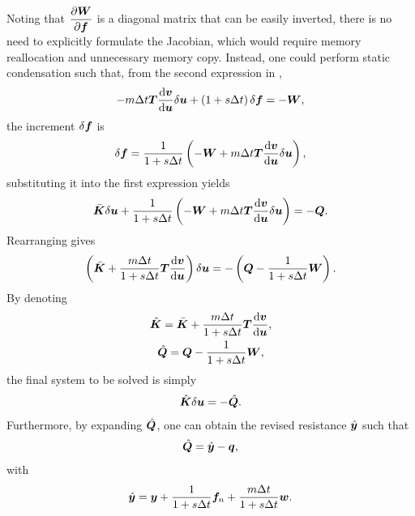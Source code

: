 Noting that $\dfrac{\partial{\bm{W}}}{\partial{\bm{f}}}$ is a diagonal matrix that can be easily inverted, there is no need to explicitly formulate the Jacobian, which would require memory reallocation and unnecessary memory copy. Instead, one could perform static condensation such that, from the second expression in ,
\begin{gather}
-m\Delta{}t\bm{T}\dfrac{\mathrm{d}\bm{v}}{\mathrm{d}\bm{u}}\delta\bm{u}+\left(1+s\Delta{}t\right)\delta\bm{f}=-\bm{W},
\end{gather}
the increment $\delta\bm{f}$ is
\begin{gather}\label{eq:incre_f}
\delta\bm{f}=\dfrac{1}{1+s\Delta{}t}\left(-\bm{W}+m\Delta{}t\bm{T}\dfrac{\mathrm{d}\bm{v}}{\mathrm{d}\bm{u}}\delta\bm{u}\right),
\end{gather}
substituting it into the first expression yields
\begin{gather}
\bar{\bm{K}}\delta\bm{u}+\dfrac{1}{1+s\Delta{}t}\left(-\bm{W}+m\Delta{}t\bm{T}\dfrac{\mathrm{d}\bm{v}}{\mathrm{d}\bm{u}}\delta\bm{u}\right)=-\bm{Q}.
\end{gather}
Rearranging gives
\begin{gather}
\left(\bar{\bm{K}}+\dfrac{m\Delta{}t}{1+s\Delta{}t}\bm{T}\dfrac{\mathrm{d}\bm{v}}{\mathrm{d}\bm{u}}\right)\delta\bm{u}=-\left(\bm{Q}-\dfrac{1}{1+s\Delta{}t}\bm{W}\right).
\end{gather}
By denoting
\begin{gather}\label{eq:revised_k}
\hat{\bm{K}}=\bar{\bm{K}}+\dfrac{m\Delta{}t}{1+s\Delta{}t}\bm{T}\dfrac{\mathrm{d}\bm{v}}{\mathrm{d}\bm{u}},\\
\hat{\bm{Q}}=\bm{Q}-\dfrac{1}{1+s\Delta{}t}\bm{W},
\end{gather}
the final system to be solved is simply
\begin{gather}\label{eq:revised_system}
\hat{\bm{K}}\delta\bm{u}=-\hat{\bm{Q}}.
\end{gather}
Furthermore, by expanding $\hat{\bm{Q}}$, one can obtain the revised resistance $\hat{\bm{y}}$ such that
\begin{gather}
\hat{\bm{Q}}=\hat{\bm{y}}-\bm{q},
\end{gather}
with
\begin{gather}\label{eq:revised_y}
\hat{\bm{y}}=\bm{y}+\dfrac{1}{1+s\Delta{}t}\bm{f}_n+\dfrac{m\Delta{}t}{1+s\Delta{}t}\bm{w}.
\end{gather}

